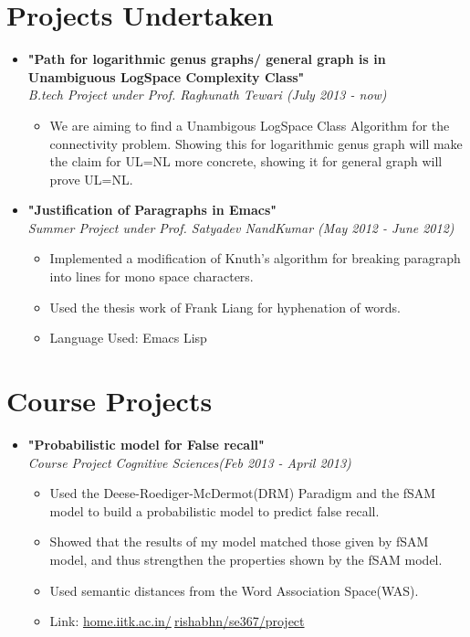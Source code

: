 \documentclass[margin,line]{resume}
\begin{document}
\begin{resume}
    \section{\mysidestyle Projects Undertaken}

    \begin{itemize}
    \item \large{\textbf{\textsf{"Path for logarithmic genus graphs/ general graph is in Unambiguous LogSpace Complexity Class"}}}
      \\ \small{\textit{B.tech Project under Prof. Raghunath Tewari (July 2013 - now)}}
      \normalsize
      \begin{itemize}
      \item We are aiming to find a Unambigous LogSpace Class Algorithm for the connectivity problem. Showing this for logarithmic genus graph will make the claim for UL=NL more concrete, showing it for general graph will prove UL=NL. 
      \end{itemize}

    \item \large{\textbf{\textsf{"Justification of Paragraphs in Emacs"}}}
      \\ \small{\textit{Summer Project under Prof. Satyadev NandKumar (May 2012 - June 2012)}}
      \normalsize
      \begin{itemize}
      \item Implemented a modification of Knuth's algorithm for breaking paragraph into lines for mono space characters.
      \item Used the thesis work of Frank Liang for hyphenation of words.
      \item Language Used: Emacs Lisp 
      \end{itemize}
      
    \end{itemize}


    \section{\mysidestyle Course Projects}

    \begin{itemize}

    \item \large{\textbf{\textsf{"Probabilistic model for False recall"}}}
      \\ \small{\textit{Course Project Cognitive Sciences(Feb 2013 - April 2013)}}
      \normalsize
      \begin{itemize}
      \item Used the Deese-Roediger-McDermot(DRM) Paradigm and the fSAM model to build a probabilistic model to predict false recall.
      \item Showed that the results of my model matched those given by fSAM model, and thus strengthen the properties shown by the fSAM model.
      \item Used semantic distances from the Word Association Space(WAS). 
      \item Link: \href{http://home.iitk.ac.in/~rishabhn/se367/project/}{home.iitk.ac.in/$~$rishabhn/se367/project}
      \end{itemize}


\end{itemize}
\end{resume}
\end{document}
